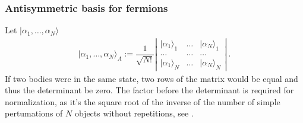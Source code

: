 \documentclass[letterpaper,10pt,english]{jupyterBook}
\begin{document}
\subsubsection{Anti\sphinxhyphen{}symmetric basis for fermions}
\label{\detokenize{ch/quantum-mechanics/many-body/identical-systems:anti-symmetric-basis-for-fermions}}\label{\detokenize{ch/quantum-mechanics/many-body/identical-systems:quantum-mechanics-second-quantizazion-identical-symmetrization-fermions}}
\sphinxAtStartPar
Let \(| \alpha_1, \dots, \alpha_N \rangle\)
\begin{equation*}
\begin{split}| \alpha_1, \dots, \alpha_N \rangle_A := \dfrac{1}{\sqrt{N!}} \left| \begin{matrix} | \alpha_1\rangle_1 & \dots & | \alpha_N \rangle_1 \\ \dots & \dots & \dots \\ | \alpha_1\rangle_N & \dots & | \alpha_N \rangle_N \end{matrix} \right| \ .\end{split}
\end{equation*}
\sphinxAtStartPar
If two bodies were in the same state, two rows of the matrix would be equal and thus the determinant be zero. The factor before the determinant is required for normalization, as it’s the square root of the inverse of the number of simple pertumations of \(N\) objects without repetitions, see .
\label{ch/quantum-mechanics/many-body/identical-systems:example-1}
\end{document}
